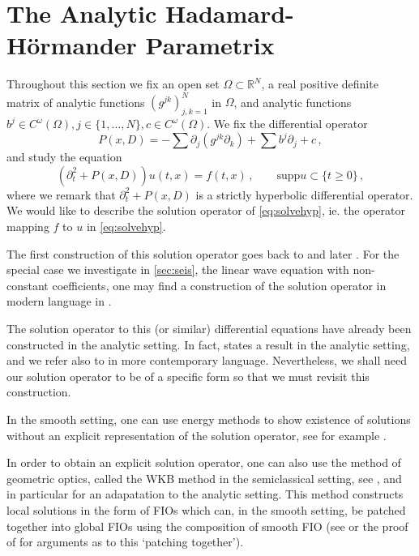 \documentclass[
	fontsize=11pt, 
	twoside=false, 
	abstract=true, 
	a4paper,
]{scrartcl}
\newcommand{\RR}{\mathbb{R}}
\newcommand{\del}{\partial}
\newcommand{\supp}{\mathrm{supp}}
\begin{document}
\section{The Analytic Hadamard-H\"ormander Parametrix}\label{sec:para}

Throughout this section we fix an open set $\Omega \subset \RR^N$, a real positive definite matrix of analytic functions $(g^{jk})_{j,k=1}^N$ in $\Omega$, and analytic functions $b^j \in C^\omega(\Omega), j\in\{1,\dots,N\}, c\in C^\omega(\Omega)$. We fix the differential operator
\[
	P(x,D) = -\sum \del_j(g^{jk} \del_k)+ \sum b^j\del_j + c\,,
\]
and study the equation
	\begin{equation}\label{eq:solvehyp}
		(\del_t^2 + P(x,D)) u(t,x) = f(t,x)\,,\qquad \supp u \subset \{t\geq 0\}\,,
	\end{equation}
	where we remark that $\del_t^2 + P(x,D)$ is a strictly hyperbolic differential operator. We would like to describe the solution operator of \cref{eq:solvehyp}, ie. the operator mapping $f$ to $u$ in \cref{eq:solvehyp}. 

	The first construction of this solution operator goes back to \cite{zbMATH02550576} and later \cite{zbMATH03051403}. For the special case we investigate in \cref{sec:seis}, the linear wave equation with non-constant coefficients, one may find a construction of the solution operator in modern language in \cite{zbMATH03531851,zbMATH03495276,MR0162045,zbMATH05136052}. 

The solution operator to this (or similar) differential equations have already been constructed in the analytic setting. In fact, \cite{zbMATH02550576} states a result in the analytic setting, and we refer also to \cite{zbMATH06469358,zbMATH07060663,zbMATH01014656,zbMATH06294222,zbMATH06828045} in more contemporary language. Nevertheless, we shall need our solution operator to be of a specific form so that we must revisit this construction.

In the smooth setting, one can use energy methods to show existence of solutions without an explicit representation of the solution operator, see for example \cite[\S~23]{zbMATH05129478}.

In order to obtain an explicit solution operator, one can also use the method of geometric optics, called the WKB method in the semiclassical setting, see \cite{MR1269107,zbMATH05817029,zbMATH03709065,Duistermaat1994,AST_1982__95__R3_0,MR2918544,MR4436039,MR0516965,zbMATH03136866}, and in particular \cite[Prop.~23.2.7]{MR4436039} for an adapatation to the analytic setting. This method constructs local solutions in the form of FIOs which can, in the smooth setting, be patched together into global FIOs using the composition of smooth FIO (see \cite[\S~VIII.5]{zbMATH03709065} or the proof of \cite[Thm.~23.2.4]{zbMATH05129478} for arguments as to this `patching together').
\end{document}
